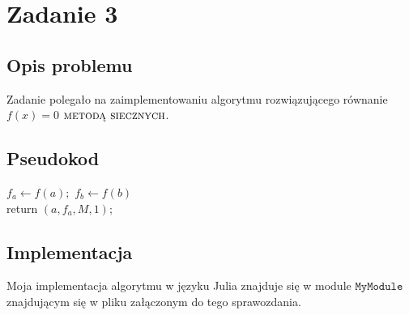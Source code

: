 \section{Zadanie 3}
\subsection{Opis problemu}
Zadanie polegało na zaimplementowaniu algorytmu rozwiązującego równanie $ f(x) = 0 $ $\textsc{metodą siecznych} $.
\subsection{Pseudokod}
\begin{algorithm}[H]
  $f_a \leftarrow f(a);$ $f_b \leftarrow f(b)$\\
  return $ (a, f_a, M, 1) $;  
\end{algorithm}
\subsection{Implementacja}
Moja implementacja algorytmu w języku Julia znajduje się w module $ \texttt{MyModule} $ znajdującym się w pliku załączonym do tego sprawozdania.